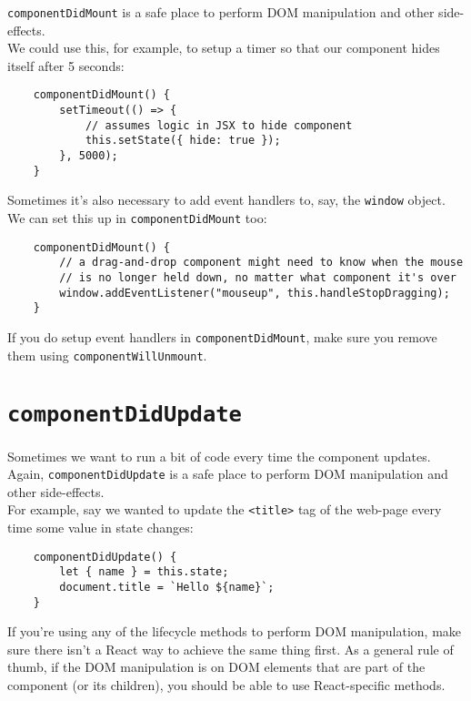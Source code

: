 \texttt{componentDidMount} is a safe place to perform DOM manipulation and other side-effects.
\\

We could use this, for example, to setup a timer so that our component hides itself after 5 seconds:

\begin{verbatim}
    componentDidMount() {
        setTimeout(() => {
            // assumes logic in JSX to hide component
            this.setState({ hide: true });
        }, 5000);
    }
\end{verbatim}

Sometimes it's also necessary to add event handlers to, say, the \texttt{window} object. We can set this up in \texttt{componentDidMount} too:

\begin{verbatim}
    componentDidMount() {
        // a drag-and-drop component might need to know when the mouse
        // is no longer held down, no matter what component it's over
        window.addEventListener("mouseup", this.handleStopDragging);
    }
\end{verbatim}

If you do setup event handlers in \texttt{componentDidMount}, make sure you remove them using \texttt{componentWillUnmount}.


\section{\texttt{componentDidUpdate}}

Sometimes we want to run a bit of code every time the component updates.
\\

Again, \texttt{componentDidUpdate} is a safe place to perform DOM manipulation and other side-effects.
\\

For example, say we wanted to update the \texttt{<title>} tag of the web-page every time some value in state changes:

\begin{verbatim}
    componentDidUpdate() {
        let { name } = this.state;
        document.title = `Hello ${name}`;
    }
\end{verbatim}

If you're  using any of the lifecycle methods to perform DOM manipulation, make sure there isn't a React way to achieve the same thing first. As a general rule of thumb, if the DOM manipulation is on DOM elements that are part of the component (or its children), you should be able to use React-specific methods.



